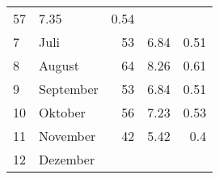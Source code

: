\begin{longtable}{lXrrr}
       \num{57} &
       \num[round-mode=places,round-precision=2]{7,35} &
         \num[round-mode=places,round-precision=2]{0,54} \\

     7 &
     \multicolumn{1}{X}{ Juli   } &


       \num{53} &
       \num[round-mode=places,round-precision=2]{6,84} &
         \num[round-mode=places,round-precision=2]{0,51} \\

     8 &
     \multicolumn{1}{X}{ August   } &


       \num{64} &
       \num[round-mode=places,round-precision=2]{8,26} &
         \num[round-mode=places,round-precision=2]{0,61} \\

     9 &
     \multicolumn{1}{X}{ September   } &


       \num{53} &
       \num[round-mode=places,round-precision=2]{6,84} &
         \num[round-mode=places,round-precision=2]{0,51} \\

     10 &
     \multicolumn{1}{X}{ Oktober   } &


       \num{56} &
       \num[round-mode=places,round-precision=2]{7,23} &
         \num[round-mode=places,round-precision=2]{0,53} \\

     11 &
     \multicolumn{1}{X}{ November   } &


       \num{42} &
       \num[round-mode=places,round-precision=2]{5,42} &
         \num[round-mode=places,round-precision=2]{0,4} \\

     12 &
     \multicolumn{1}{X}{ Dezember   } &



\end{longtable}

